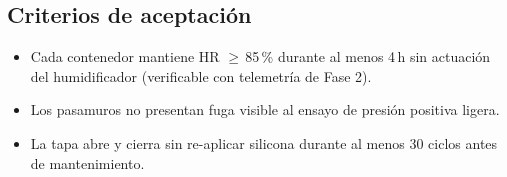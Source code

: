 \subsection{Criterios de aceptación}
\label{sec:contenedores:aceptacion}

\begin{itemize}[leftmargin=*,itemsep=0pt]
  \item Cada contenedor mantiene HR $\geq$\,85\,\% durante al menos 4\,h
        sin actuación del humidificador (verificable con telemetría
        de Fase 2).
  \item Los pasamuros no presentan fuga visible al ensayo de presión
        positiva ligera.
  \item La tapa abre y cierra sin re-aplicar silicona durante al menos
        30 ciclos antes de mantenimiento.
\end{itemize}

